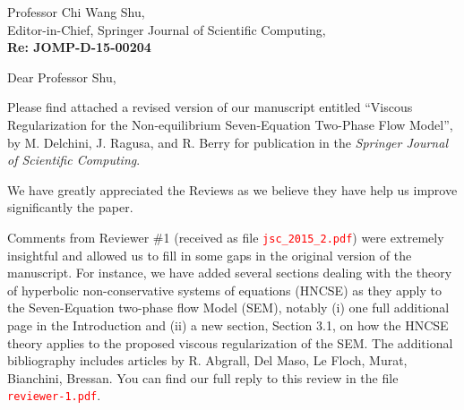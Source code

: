\documentclass[11pt]{letter}
\newcommand{\tcr}[1]{\textcolor{red}{#1}}
\begin{document}
\begin{letter}{Professor Chi Wang Shu, \\  Editor-in-Chief, Springer Journal of Scientific Computing,\\
\textbf{Re: JOMP-D-15-00204}}


\date{\today}

\opening{Dear Professor Shu,}
         \vspace{0.25cm}

Please find attached  a revised version of our manuscript entitled
``Viscous Regularization for the Non-equilibrium Seven-Equation Two-Phase Flow Model'',
by M. Delchini, J. Ragusa, and R. Berry for publication in the {\it  Springer Journal of Scientific Computing}. 

We have greatly appreciated the Reviews as we believe they have help us improve significantly the paper. 

Comments from Reviewer \#1 (received as file \tcr{{\tt jsc\_2015\_2.pdf}}) were extremely insightful and allowed
us to fill in some gaps in the original version of the manuscript. For instance, we have added several sections
dealing with the theory of hyperbolic non-conservative systems of equations (HNCSE) as they apply to the 
Seven-Equation two-phase flow Model (SEM), notably (i) one full additional page in the Introduction and 
(ii) a new section, Section 3.1, on how the HNCSE theory applies to the proposed viscous regularization of the SEM.
The additional bibliography includes articles by R. Abgrall, Del Maso, Le Floch, Murat, Bianchini, Bressan. You can find 
our full reply to this review in the file \tcr{{\tt reviewer-1.pdf}}.



\end{letter}
\end{document}
